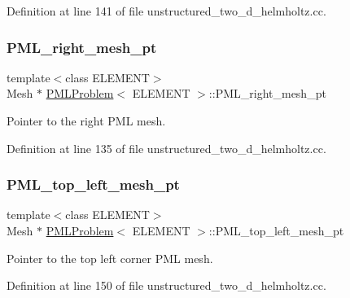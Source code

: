 Definition at line 141 of file unstructured\+\_\+two\+\_\+d\+\_\+helmholtz.\+cc.

\mbox{\label{classPMLProblem_aa325b694fc238fa65549ba5fca9c47ac}} 
\subsubsection{\texorpdfstring{P\+M\+L\+\_\+right\+\_\+mesh\+\_\+pt}{PML\_right\_mesh\_pt}}
{\footnotesize\ttfamily template$<$class E\+L\+E\+M\+E\+NT$>$ \\
Mesh $\ast$ \hyperlink{classPMLProblem}{P\+M\+L\+Problem}$<$ E\+L\+E\+M\+E\+NT $>$\+::P\+M\+L\+\_\+right\+\_\+mesh\+\_\+pt\hspace{0.3cm}{\ttfamily [private]}}



Pointer to the right P\+ML mesh. 



Definition at line 135 of file unstructured\+\_\+two\+\_\+d\+\_\+helmholtz.\+cc.

\mbox{\label{classPMLProblem_aa74e9cdaa9f7d63cd6cd0770e30e2cbe}} 
\subsubsection{\texorpdfstring{P\+M\+L\+\_\+top\+\_\+left\+\_\+mesh\+\_\+pt}{PML\_top\_left\_mesh\_pt}}
{\footnotesize\ttfamily template$<$class E\+L\+E\+M\+E\+NT$>$ \\
Mesh $\ast$ \hyperlink{classPMLProblem}{P\+M\+L\+Problem}$<$ E\+L\+E\+M\+E\+NT $>$\+::P\+M\+L\+\_\+top\+\_\+left\+\_\+mesh\+\_\+pt\hspace{0.3cm}{\ttfamily [private]}}



Pointer to the top left corner P\+ML mesh. 



Definition at line 150 of file unstructured\+\_\+two\+\_\+d\+\_\+helmholtz.\+cc.

